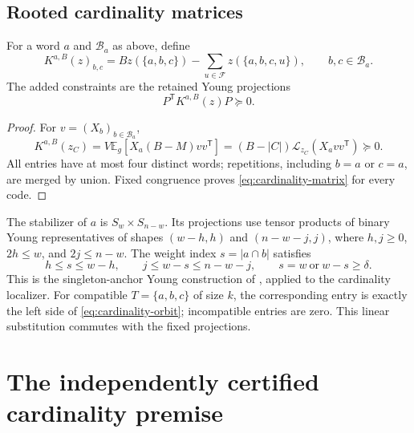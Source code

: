 \documentclass[11pt]{article}
\newcommand{\F}{\mathcal F}
\newcommand{\Lzc}{\mathcal L_{z_C}}
\newcommand{\E}{\mathbb E}
\begin{document}
\subsection{Rooted cardinality matrices}\label{subsec:cardinality-matrix}

For a word $a$ and $\mathcal B_a$ as above, define
\[
 K^{a,B}(z)_{b,c}
 =Bz(\{a,b,c\})-\sum_{u\in\F}z(\{a,b,c,u\}),
 \qquad b,c\in\mathcal B_a.
\]
The added constraints are the retained Young projections
\begin{equation}\label{eq:cardinality-matrix}
 P^{\mathsf T}K^{a,B}(z)P\succeq0.
\end{equation}

\begin{proof}
For $v=(X_b)_{b\in\mathcal B_a}$,
\[
 K^{a,B}(z_C)
 =V\E_g[X_a(B-M)vv^{\mathsf T}]
 =(B-|C|)\Lzc(X_avv^{\mathsf T})\succeq0.
\]
All entries have at most four distinct words; repetitions, including $b=a$
or $c=a$, are merged by union. Fixed congruence proves
\eqref{eq:cardinality-matrix} for every code.
\end{proof}

The stabilizer of $a$ is $S_w\times S_{n-w}$. Its projections use tensor
products of binary Young representatives of shapes $(w-h,h)$ and
$(n-w-j,j)$, where $h,j\ge0$, $2h\le w$, and $2j\le n-w$. The weight index
$s=|a\cap b|$ satisfies
\[
 h\le s\le w-h,\qquad j\le w-s\le n-w-j,\qquad
 s=w\ \text{or}\ w-s\ge\delta.
\]
This is the singleton-anchor Young construction of
\cite[Section~3.1]{Polak}, applied to the cardinality localizer.
For compatible $T=\{a,b,c\}$ of size $k$, the corresponding entry is exactly
the left side of \eqref{eq:cardinality-orbit}; incompatible entries are zero.
This linear substitution commutes with the fixed projections.

\section{The independently certified cardinality premise}\label{sec:baseline}
\end{document}
